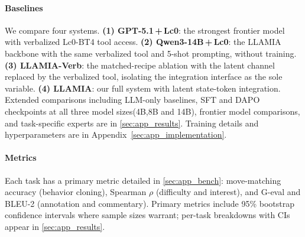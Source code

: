 \paragraph{Baselines}
We compare four systems. \textbf{(1) GPT-5.1\,+\,Lc0}: the strongest frontier model with verbalized Lc0-BT4 tool access. \textbf{(2) Qwen3-14B\,+\,Lc0}: the LLAMIA backbone with the same verbalized tool and 5-shot prompting, without training. \textbf{(3) LLAMIA-Verb}: the matched-recipe ablation with the latent channel replaced by the verbalized tool, isolating the integration interface as the sole variable. \textbf{(4) LLAMIA}: our full system with latent state-token integration. Extended comparisons including LLM-only baselines, SFT and DAPO checkpoints at all three model sizes(4B,8B and 14B), frontier model comparisons, and task-specific experts are in \cref{sec:app_results}. Training details and hyperparameters are in Appendix~\ref{sec:app_implementation}.

\paragraph{Metrics}
Each task has a primary metric detailed in \cref{sec:app_bench}: move-matching accuracy (behavior cloning), Spearman $\rho$ (difficulty and interest), and G-eval and BLEU-2 (annotation and commentary). Primary metrics include 95\% bootstrap confidence intervals where sample sizes warrant; per-task breakdowns with CIs appear in \cref{sec:app_results}.

